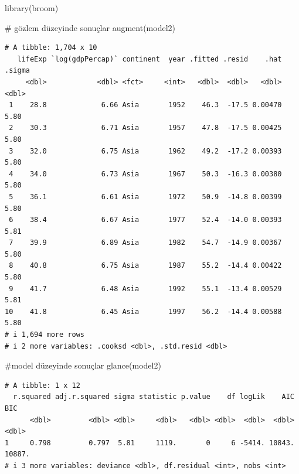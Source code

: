 \documentclass[
  letterpaper,
  DIV=11,
  numbers=noendperiod]{scrreprt}
\newenvironment{Shaded}{\begin{snugshade}}{\end{snugshade}}
\newcommand{\CommentTok}[1]{\textcolor[rgb]{0.37,0.37,0.37}{#1}}
\newcommand{\FunctionTok}[1]{\textcolor[rgb]{0.28,0.35,0.67}{#1}}
\newcommand{\NormalTok}[1]{\textcolor[rgb]{0.00,0.23,0.31}{#1}}
\begin{document}
\begin{Shaded}
\begin{Highlighting}[]
\FunctionTok{library}\NormalTok{(broom)}

\CommentTok{\# gözlem düzeyinde sonuçlar}
\FunctionTok{augment}\NormalTok{(model2)}
\end{Highlighting}
\end{Shaded}

\begin{verbatim}
# A tibble: 1,704 x 10
   lifeExp `log(gdpPercap)` continent  year .fitted .resid    .hat .sigma
     <dbl>            <dbl> <fct>     <int>   <dbl>  <dbl>   <dbl>  <dbl>
 1    28.8             6.66 Asia       1952    46.3  -17.5 0.00470   5.80
 2    30.3             6.71 Asia       1957    47.8  -17.5 0.00425   5.80
 3    32.0             6.75 Asia       1962    49.2  -17.2 0.00393   5.80
 4    34.0             6.73 Asia       1967    50.3  -16.3 0.00380   5.80
 5    36.1             6.61 Asia       1972    50.9  -14.8 0.00399   5.80
 6    38.4             6.67 Asia       1977    52.4  -14.0 0.00393   5.81
 7    39.9             6.89 Asia       1982    54.7  -14.9 0.00367   5.80
 8    40.8             6.75 Asia       1987    55.2  -14.4 0.00422   5.80
 9    41.7             6.48 Asia       1992    55.1  -13.4 0.00529   5.81
10    41.8             6.45 Asia       1997    56.2  -14.4 0.00588   5.80
# i 1,694 more rows
# i 2 more variables: .cooksd <dbl>, .std.resid <dbl>
\end{verbatim}

\begin{Shaded}
\begin{Highlighting}[]
\CommentTok{\#model düzeyinde sonuçlar}
\FunctionTok{glance}\NormalTok{(model2)}
\end{Highlighting}
\end{Shaded}

\begin{verbatim}
# A tibble: 1 x 12
  r.squared adj.r.squared sigma statistic p.value    df logLik    AIC    BIC
      <dbl>         <dbl> <dbl>     <dbl>   <dbl> <dbl>  <dbl>  <dbl>  <dbl>
1     0.798         0.797  5.81     1119.       0     6 -5414. 10843. 10887.
# i 3 more variables: deviance <dbl>, df.residual <int>, nobs <int>
\end{verbatim}
\end{document}
